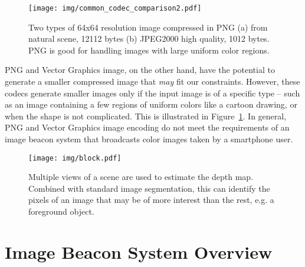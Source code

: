 \begin{figure}[!htb]
    \begin{center}
    	\vspace{-1em}
	    \texttt{[image: img/common\_codec\_comparison2.pdf]}
	    \vspace{-1em}
	    \caption{\footnotesize Two types of 64x64 resolution image compressed in PNG (a) from natural scene, 12112 bytes (b) JPEG2000 high quality, 1012 bytes. PNG is good for handling images with large uniform color regions. }
	    \label{fig:png_block}
	    \vspace{-1em}
    \end{center}
\end{figure}

PNG and Vector Graphics image, on the other hand, have the potential to generate a smaller compressed image that \textit{may} fit our constraints. However, these codecs generate smaller images only if the input image is of a specific type -- such as an image containing a few regions of uniform colors like a cartoon drawing, or when the shape is not complicated. This is illustrated in Figure~\ref{fig:png_block}. In general, PNG and Vector Graphics image encoding do not meet the requirements of an image beacon system that broadcasts color images taken by a smartphone user.




\begin{figure*}[!thb]
	\texttt{[image: img/block.pdf]}
	\caption{\footnotesize Multiple views of a scene are used to estimate the depth map. Combined with standard image segmentation, this can identify the pixels of an image that may be of more interest than the rest, e.g. a foreground object.}
	\label{fig:blocks3}
	\vspace{-1em}
\end{figure*}


\section{Image Beacon System Overview}
\label{sec:system}

